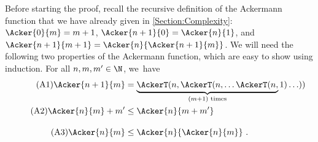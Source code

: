 \documentclass[../../diss.tex]{subfiles}
\begin{document}
Before starting the proof, recall the recursive definition of the Ackermann function that we have already given in \cref{Section:Complexity}:
$\Acker{0}{m} = m + 1 $,
$\Acker{n+1}{0} = \Acker{n}{1}$, and
$\Acker{n+1}{m+1} = \Acker{n}{\Acker{n+1}{m}}$.
We will need the following two properties of the Ackermann function, which are easy to show using induction.
For all $n, m, m' \in \N$, we~have
\begin{align}
    \label{Equation:AckerOne}\tag{A1}%
    \Acker{n+1}{m}
    &=
    \underbrace{ \AckerT(n, \AckerT(n, \ldots \AckerT(n, }_{(m+1) \text{ times}} 1) \ldots ))
\\
    \label{Equation:AckerTwo}\tag{A2}%
    \Acker{n}{m} + m' &\leq \Acker{n}{m + m'}
\\[1em]
    \label{Equation:AckerThree}\tag{A3}%
    \Acker{n}{m} &\leq \Acker{n}{\Acker{n}{m}}
    \ .
\end{align}
\end{document}
